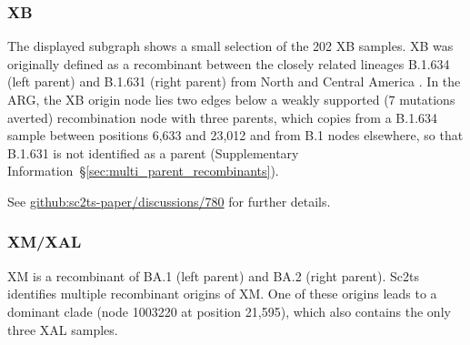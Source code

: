 \documentclass[12pt]{article}
\newcommand{\supref}[1]{Supplementary Information~\S\ref{#1}}
\begin{document}
\newcommand{\scghdiscussion}[1]{%
See \href{https://github.com/jeromekelleher/sc2ts-paper/discussions/#1}%
{github:sc2ts-paper/discussions/#1} for further details.}
\newcommand{\scghdiscussiontwo}[2]{%
See \href{https://github.com/jeromekelleher/sc2ts-paper/discussions/#1}%
{github:sc2ts-paper/discussions/#1} for further details on #2.}
\subsubsection{XB}
\label{sec:dd_xb}

The displayed subgraph shows a small selection of the 202 XB samples.
XB was originally defined as a recombinant between
the closely related lineages B.1.634 (left parent) and B.1.631 (right parent)
from North and Central America \cite{Gutierrez2022}.
In the ARG, the XB origin node lies two edges below a weakly supported
(7 mutations averted) recombination node with three parents,
which copies from a B.1.634 sample between positions 6,633 and 23,012
and from B.1 nodes elsewhere, so that B.1.631 is not identified as a parent
(\supref{sec:multi_parent_recombinants}).



\scghdiscussion{780}

\subsubsection{XM/XAL}
\label{sec:dd_xm}

XM is a recombinant of BA.1 (left parent) and BA.2 (right parent).
Sc2ts identifies multiple recombinant origins of XM.
One of these origins leads to a dominant clade
(node 1003220 at position 21,595),
which also contains the only three XAL samples.
\end{document}
